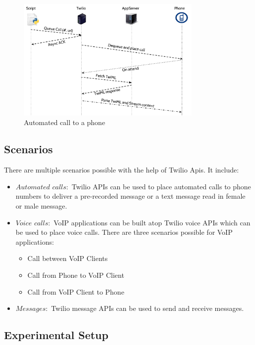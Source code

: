 \begin{figure}[t!] 
\centering
  \includegraphics[width=0.8\textwidth]{figs/auto.pdf}
\caption{Automated call to a phone}
\label{fig:autocall}
\end{figure} 

\subsection{Scenarios}

There are multiple scenarios possible with the help of Twilio Apis. It include:

\begin{itemize}
\item $Automated$ $calls: $ Twilio APIs can be used to place automated calls to phone numbers to deliver a pre-recorded message or a text message read in female or male message.
\item $Voice$ $calls: $ VoIP applications can be built atop Twilio voice APIs which can be used to place voice calls. There are three scenarios possible for VoIP applications:  
\begin{itemize}
\item Call between VoIP Clients
\item Call from Phone to VoIP Client
\item Call from VoIP Client to Phone
\end{itemize}
\item $Messages: $ Twilio message APIs can be used to send and receive messages.
\end{itemize}

\subsection{Experimental Setup}

